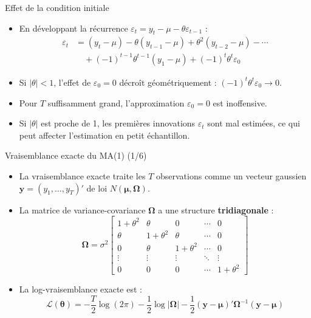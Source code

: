 \documentclass[11pt,aspectratio=169]{beamer}
\begin{document}
\begin{frame}{Effet de la condition initiale}

\begin{itemize}

\item En développant la récurrence $\varepsilon_t = y_t - \mu - \theta \varepsilon_{t-1}$ :
  \begin{align*}
  \varepsilon_t &= (y_t - \mu) - \theta(y_{t-1} - \mu) + \theta^2(y_{t-2} - \mu) - \cdots \\
  &\quad + (-1)^{t-1} \theta^{t-1}(y_1 - \mu) + (-1)^t \theta^t \varepsilon_0
  \end{align*}\newline

\item Si $|\theta| < 1$, l'effet de $\varepsilon_0 = 0$ décroît géométriquement : $(-1)^t \theta^t \varepsilon_0 \to 0$.\newline

\item Pour $T$ suffisamment grand, l'approximation $\varepsilon_0 = 0$ est inoffensive.\newline

\item Si $|\theta|$ est proche de 1, les premières innovations $\varepsilon_t$ sont mal estimées, ce qui peut affecter l'estimation en petit échantillon.

\end{itemize}

\end{frame}

\begin{frame}{Vraisemblance exacte du MA(1) (1/6)}

\begin{itemize}

\item La vraisemblance exacte traite les $T$ observations comme un vecteur gaussien $\mathbf{y} = (y_1, \ldots, y_T)'$ de loi $N(\bm{\mu}, \bm{\Omega})$.\newline

\item La matrice de variance-covariance $\bm{\Omega}$ a une structure \textbf{tridiagonale} :
  \[
  \bm{\Omega} = \sigma^2 \begin{bmatrix} 1+\theta^2 & \theta & 0 & \cdots & 0 \\ \theta & 1+\theta^2 & \theta & \cdots & 0 \\ 0 & \theta & 1+\theta^2 & \cdots & 0 \\ \vdots & \vdots & \vdots & \ddots & \vdots \\ 0 & 0 & 0 & \cdots & 1+\theta^2 \end{bmatrix}
  \]\newline

\item La log-vraisemblance exacte est :
  \[
  \mathcal{L}(\bm{\theta}) = -\frac{T}{2}\log(2\pi) - \frac{1}{2}\log|\bm{\Omega}| - \frac{1}{2}(\mathbf{y} - \bm{\mu})'\bm{\Omega}^{-1}(\mathbf{y} - \bm{\mu})
  \]

\end{itemize}

\end{frame}
\end{document}
